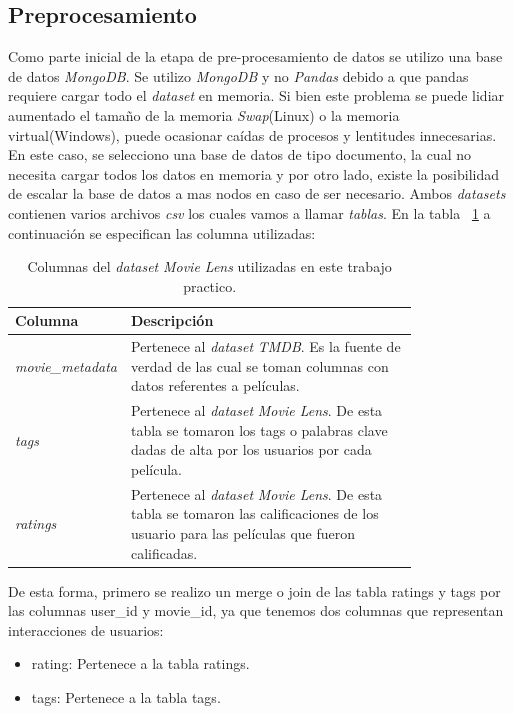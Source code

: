 \documentclass[11pt,a4paper,twoside]{thesis}
\begin{document}
\subsection{Preprocesamiento}

Como parte inicial de la etapa de pre-procesamiento de datos se utilizo una base de datos \textit{MongoDB}. Se utilizo \textit{MongoDB} y no \textit{Pandas} debido a que pandas requiere cargar todo el \textit{dataset} en memoria. Si bien este problema se puede lidiar aumentado el tamaño de la memoria \textit{Swap}(Linux) o la memoria virtual(Windows), puede ocasionar caídas de procesos y lentitudes innecesarias. En este caso, se selecciono una base de datos de tipo documento, la cual no necesita cargar todos los datos en memoria y por otro lado, existe la posibilidad de escalar la base de datos a mas nodos en caso de ser necesario.
Ambos \textit{datasets} contienen varios archivos \textit{csv} los cuales vamos a llamar \textit{tablas}. En la tabla ~\ref{table:tableRatings} a continuación se especifican las columna utilizadas:

\begin{table}[!htb]
	\centering
	\footnotesize
	\begin{tabular}{l | p{0.8\linewidth}}
	\hline
		Columna              & Descripción \\
	\hline
	\textit{movie\_metadata} & Pertenece al \textit{dataset} \textit{TMDB}. Es la fuente de verdad de las cual se toman columnas con datos referentes a películas. \\
	\textit{tags}            & Pertenece al \textit{dataset} \textit{Movie Lens}. De esta tabla se tomaron los tags o palabras clave dadas de alta por los usuarios por cada película. \\
	\textit{ratings}         & Pertenece al \textit{dataset} \textit{Movie Lens}. De esta tabla se tomaron las calificaciones de los usuario para las películas que fueron calificadas. \\
	\hline
	\end{tabular}
	\caption{
		Columnas del \textit{dataset} \textit{Movie Lens} utilizadas en este trabajo practico.
	}
	\label{table:tableRatings}
\end{table}


De esta forma, primero se realizo un merge o join de las tabla ratings y tags por las columnas user\_id y movie\_id,
 ya que tenemos dos columnas que representan interacciones de usuarios: 

\begin{itemize}
	\item rating: Pertenece a la tabla ratings.
	\item tags: Pertenece a la tabla tags.
\end{itemize}
\end{document}
